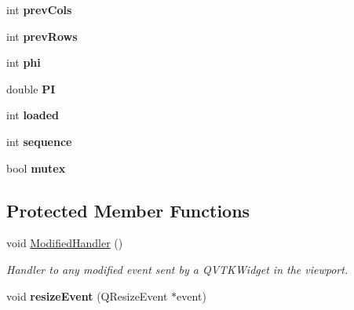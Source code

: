 \begin{DoxyCompactItemize}
\item 
\hypertarget{class_share_camera_qt_a2e780b4523280e1b122f69365334ee35}{int {\bfseries prev\-Cols}}\label{class_share_camera_qt_a2e780b4523280e1b122f69365334ee35}

\item 
\hypertarget{class_share_camera_qt_a65d965d694e4354fe5ed3bf5dd66e04d}{int {\bfseries prev\-Rows}}\label{class_share_camera_qt_a65d965d694e4354fe5ed3bf5dd66e04d}

\item 
\hypertarget{class_share_camera_qt_a6c74bb628ad63c1260d3203cc9b21a9d}{int {\bfseries phi}}\label{class_share_camera_qt_a6c74bb628ad63c1260d3203cc9b21a9d}

\item 
\hypertarget{class_share_camera_qt_a2b83ee3a2baec81a4f282052830a6870}{double {\bfseries P\-I}}\label{class_share_camera_qt_a2b83ee3a2baec81a4f282052830a6870}

\item 
\hypertarget{class_share_camera_qt_a210fbcd058c8e7e6bc8d854f85b7043a}{int {\bfseries loaded}}\label{class_share_camera_qt_a210fbcd058c8e7e6bc8d854f85b7043a}

\item 
\hypertarget{class_share_camera_qt_a3c9cc3c4decd2b64c37c673cd5e0dde5}{int {\bfseries sequence}}\label{class_share_camera_qt_a3c9cc3c4decd2b64c37c673cd5e0dde5}

\item 
\hypertarget{class_share_camera_qt_aecb3fd3a833a6db8f73badfce03847de}{bool {\bfseries mutex}}\label{class_share_camera_qt_aecb3fd3a833a6db8f73badfce03847de}

\end{DoxyCompactItemize}
\subsection*{Protected Member Functions}
\begin{DoxyCompactItemize}
\item 
void \hyperlink{class_share_camera_qt_a588ec8b6bdfa28c8542b6597a21b7f2e}{Modified\-Handler} ()
\begin{DoxyCompactList}\small\item\em Handler to any modified event sent by a Q\-V\-T\-K\-Widget in the viewport. \end{DoxyCompactList}\item 
\hypertarget{class_share_camera_qt_aba78fa4899233386a4a0ed0b3dae0c6f}{void {\bfseries resize\-Event} (Q\-Resize\-Event $\ast$event)}\label{class_share_camera_qt_aba78fa4899233386a4a0ed0b3dae0c6f}

\end{DoxyCompactItemize}


